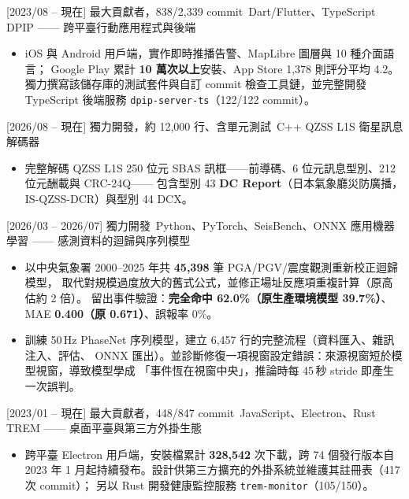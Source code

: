 \documentclass[zh]{resume}
\begin{document}
\begin{projects}
  \separator{0.7em}

  \project%
    {}[2023/08 -- 現在]%
    {最大貢獻者，838/2,339 commit}%
    {\,Dart/Flutter、TypeScript}%
    {DPIP —— 跨平臺行動應用程式與後端}%
    {\begin{itemize}
      \item iOS 與 Android 用戶端，實作即時推播告警、MapLibre 圖層與 10 種介面語言；
        Google Play 累計 \textbf{10 萬次以上}安裝、App Store 1,378 則評分平均 4.2。
        獨力撰寫該儲存庫的測試套件與自訂 commit 檢查工具鏈，並完整開發 TypeScript 後端服務
        \texttt{dpip-server-ts}（122/122 commit）。
    \end{itemize}}

  \separator{0.7em}

  \project%
    {}[2026/08 -- 現在]%
    {獨力開發，約 12,000 行、含單元測試}%
    {\,C++}%
    {QZSS L1S 衛星訊息解碼器}%
    {\begin{itemize}
      \item 完整解碼 QZSS L1S 250 位元 SBAS 訊框——前導碼、6 位元訊息型別、212 位元酬載與 CRC-24Q——
        包含型別 43 \textbf{DC Report}（日本氣象廳災防廣播，IS-QZSS-DCR）與型別 44 DCX。
    \end{itemize}}

  \separator{0.7em}

  \project%
    {}[2026/03 -- 2026/07]%
    {獨力開發}%
    {\,Python、PyTorch、SeisBench、ONNX}%
    {應用機器學習 —— 感測資料的迴歸與序列模型}%
    {\begin{itemize}
      \item 以中央氣象署 2000--2025 年共 \textbf{45,398} 筆 PGA/PGV/震度觀測重新校正迴歸模型，
        取代對規模過度放大的舊式公式，並修正場址反應項重複計算（原高估約 2 倍）。
        留出事件驗證：\textbf{完全命中 62.0\%（原生產環境模型 39.7\%）}、
        MAE \textbf{0.400（原 0.671）}、誤報率 0\%。
      \item 訓練 50\,Hz PhaseNet 序列模型，建立 6,457 行的完整流程（資料匯入、雜訊注入、評估、
        ONNX 匯出）。並診斷修復一項視窗設定錯誤：來源視窗短於模型視窗，導致模型學成
        「事件恆在視窗中央」，推論時每 45\,秒 stride 即產生一次誤判。
    \end{itemize}}

  \separator{0.7em}

  \project%
    {}[2023/01 -- 現在]%
    {最大貢獻者，448/847 commit}%
    {\,JavaScript、Electron、Rust}%
    {TREM —— 桌面平臺與第三方外掛生態}%
    {\begin{itemize}
      \item 跨平臺 Electron 用戶端，安裝檔累計 \textbf{328,542} 次下載，跨 74 個發行版本自 2023 年
        1 月起持續發布。設計供第三方擴充的外掛系統並維護其註冊表（417 次 commit）；
        另以 Rust 開發健康監控服務 \texttt{trem-monitor}（105/150）。
    \end{itemize}}
\end{projects}
\end{document}

